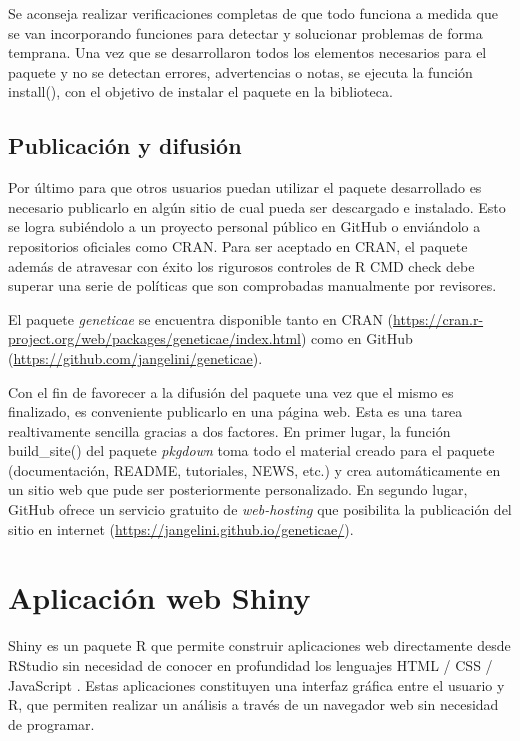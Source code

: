 Se aconseja realizar verificaciones completas de que todo funciona a medida que se van incorporando funciones para detectar y solucionar problemas de forma temprana. Una vez que se desarrollaron todos los elementos necesarios para el paquete y no se detectan errores, advertencias o notas, se ejecuta la función \textcolor{fandango}{install()}, con el objetivo de instalar el paquete en la biblioteca.


\subsection{Publicación y difusión}

Por último para que otros usuarios puedan utilizar el paquete desarrollado es necesario publicarlo en algún sitio de cual pueda ser descargado e instalado. Esto se logra subiéndolo a un proyecto personal público en GitHub o enviándolo a repositorios oficiales como CRAN. Para ser aceptado en CRAN, el paquete además de atravesar con éxito los rigurosos controles de R CMD check debe superar una serie de políticas que son comprobadas manualmente por revisores. 

El paquete \emph{geneticae} se encuentra disponible tanto en CRAN (\url{https://cran.r-project.org/web/packages/geneticae/index.html}) como en GitHub (\url{https://github.com/jangelini/geneticae}). 

Con el fin de favorecer a la difusión del paquete una vez que el mismo es finalizado, es conveniente publicarlo en una página web. Esta es una tarea realtivamente sencilla gracias a dos factores. En primer lugar, la función \textcolor{fandango}{build\_site()} del paquete \emph{pkgdown} toma todo el material creado para el paquete (documentación, README, tutoriales, NEWS, etc.) y crea automáticamente en un sitio web que pude ser posteriormente personalizado. En segundo lugar, GitHub ofrece un servicio gratuito de \emph{web-hosting} que posibilita la publicación del sitio en internet (\url{https://jangelini.github.io/geneticae/}).

\section{Aplicación web Shiny}

Shiny es un paquete R que permite construir aplicaciones web directamente desde RStudio sin necesidad de conocer en profundidad los lenguajes HTML / CSS / JavaScript . Estas aplicaciones constituyen una interfaz gráfica entre el usuario y R, que permiten realizar un análisis a través de un navegador web sin necesidad de programar.

